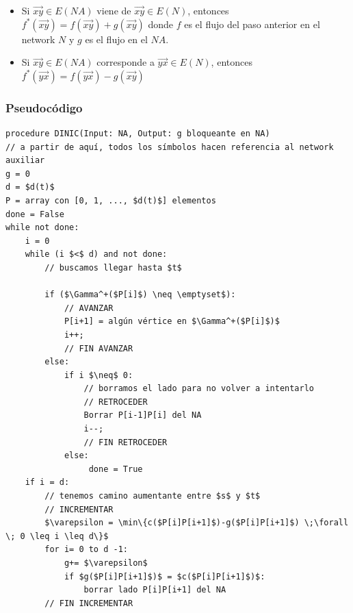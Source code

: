 \documentclass[10pt,a4paper]{article}
\begin{document}
\begin{itemize}

	\item Si $\overrightarrow{xy}\in E(NA)$ viene de $\overrightarrow{xy} \in E(N)$, entonces $f^*(\overrightarrow{xy}) = f(\overrightarrow{xy}) + g(\overrightarrow{xy})$ donde $f$ es el flujo del paso anterior en el network $N$ y $g$ es el flujo en el $NA$.
	\item Si $\overrightarrow{xy} \in E(NA)$ corresponde a $\overrightarrow{yx} \in E(N)$, entonces $f^*(\overrightarrow{yx}) = f(\overrightarrow{yx}) - g(\overrightarrow{xy})$
\end{itemize}

\subsubsection*{Pseudocódigo}


    \begin{lstlisting}[language=pseudo]
procedure DINIC(Input: NA, Output: g bloqueante en NA)
// a partir de aquí, todos los símbolos hacen referencia al network auxiliar
g = 0
d = $d(t)$
P = array con [0, 1, ..., $d(t)$] elementos
done = False
while not done:
    i = 0
    while (i $<$ d) and not done:
        // buscamos llegar hasta $t$

        if ($\Gamma^+($P[i]$) \neq \emptyset$):
            // AVANZAR
            P[i+1] = algún vértice en $\Gamma^+($P[i]$)$
            i++;
            // FIN AVANZAR
        else:
            if i $\neq$ 0:
                // borramos el lado para no volver a intentarlo
                // RETROCEDER
                Borrar P[i-1]P[i] del NA
                i--;
                // FIN RETROCEDER
            else:
                 done = True 
    if i = d:
        // tenemos camino aumentante entre $s$ y $t$
        // INCREMENTAR
        $\varepsilon = \min\{c($P[i]P[i+1]$)-g($P[i]P[i+1]$) \;\forall \; 0 \leq i \leq d\}$
        for i= 0 to d -1:
            g+= $\varepsilon$
            if $g($P[i]P[i+1]$)$ = $c($P[i]P[i+1]$)$:
                borrar lado P[i]P[i+1] del NA
        // FIN INCREMENTAR
\end{lstlisting}
\end{document}
